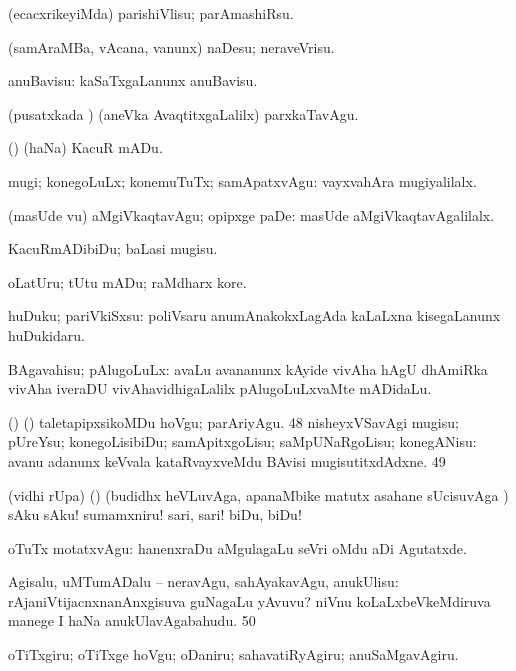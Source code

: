 {{ (ecacxrikeyiMda)
parishiVlisu; parAmashiRsu. 

 (samAraMBa, vAcana, \mo vanunx) naDesu;
neraveVrisu. 

 anuBavisu:  kaSaTxgaLanunx
anuBavisu. 

 (pusatxkada \vi) (aneVka AvaqtitxgaLalilx) parxkaTavAgu.

 (\AmA) (haNa) KacuR mADu.

 mugi; konegoLuLx; konemuTuTx; samApatxvAgu:  vayxvahAra mugiyalilalx. 

 (masUde \mo vu) aMgiVkaqtavAgu;
opipxge paDe:  masUde aMgiVkaqtavAgalilalx.

 KacuRmADibiDu; baLasi mugisu. 

 oLatUru; tUtu mADu; raMdharx kore.

 huDuku; pariVkiSxsu:  poliVsaru anumAnakokxLagAda kaLaLxna kisegaLanunx huDukidaru.

 BAgavahisu; pAlugoLuLx:  avaLu avananunx kAyide vivAha hAgU dhAmiRka vivAha iveraDU
vivAhavidhigaLalilx pAlugoLuLxvaMte mADidaLu. 

 (\AseTxrXV) (\ashi)
taletapipxsikoMDu hoVgu; parAriyAgu. 
\num{48}  nisheyxVSavAgi
mugisu; pUreYsu; konegoLisibiDu; samApitxgoLisu; saMpUNaRgoLisu; konegANisu:
 avanu adanunx keVvala kataRvayxveMdu BAvisi mugisutitxdAdxne. 
\num{49}  

 (vidhi rUpa) (\pArxparx)
(budidhx heVLuvAga, apanaMbike matutx asahane sUcisuvAga \parx) sAku
sAku! sumamxniru! sari, sari! biDu, biDu!  

 oTuTx motatxvAgu:  hanenxraDu aMgulagaLu seVri oMdu aDi Agutatxde. 

  Agisalu, uMTumADalu -- neravAgu, sahAyakavAgu,
anukUlisu:  rAjaniVtijacnxnanAnxgisuva guNagaLu yAvuvu?  niVnu koLaLxbeVkeMdiruva manege I haNa anukUlavAgabahudu. 
\num{50}  

 oTiTxgiru; oTiTxge hoVgu; oDaniru; sahavatiRyAgiru;
anuSaMgavAgiru. 

}}
